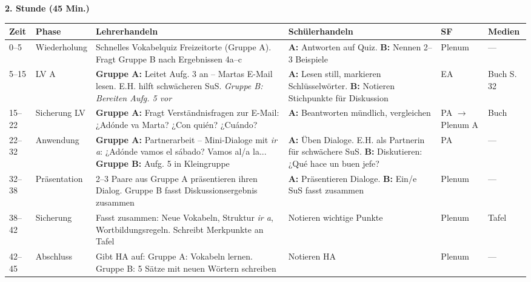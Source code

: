 \documentclass[11pt,a4paper]{article}
\begin{document}
\vspace{1em}

\textbf{2. Stunde (45 Min.)}

\begin{longtable}{|p{1cm}|p{1.5cm}|p{3.8cm}|p{3.2cm}|p{1.5cm}|p{2cm}|}
\hline
\textbf{Zeit} & \textbf{Phase} & \textbf{Lehrerhandeln} & \textbf{Schülerhandeln} & \textbf{SF} & \textbf{Medien} \\
\hline
\endhead

0--5 & Wieder\-holung & Schnelles Vokabelquiz Freizeitorte (Gruppe A). Fragt Gruppe B nach Ergebnissen 4a--c & \textbf{A:} Antworten auf Quiz. \newline \textbf{B:} Nennen 2--3 Beispiele & Plenum & --- \\
\hline

5--15 & LV A & \textbf{Gruppe A:} Leitet Aufg. 3 an -- Martas E-Mail lesen. E.H. hilft schwächeren SuS. \newline \textit{Gruppe B: Bereiten Aufg. 5 vor} & \textbf{A:} Lesen still, markieren Schlüsselwörter. \newline \textbf{B:} Notieren Stichpunkte für Diskussion & EA & Buch S. 32 \\
\hline

15--22 & Sicherung LV & \textbf{Gruppe A:} Fragt Verständnisfragen zur E-Mail: ¿Adónde va Marta? ¿Con quién? ¿Cuándo? & \textbf{A:} Beantworten mündlich, vergleichen & PA $\rightarrow$ Plenum A & Buch \\
\hline

22--32 & Anwen\-dung & \textbf{Gruppe A:} Partnerarbeit -- Mini-Dialoge mit \textit{ir a}: ¿Adónde vamos el sábado? Vamos al/a la... \newline \textbf{Gruppe B:} Aufg. 5 in Kleingruppe & \textbf{A:} Üben Dialoge. E.H. als Partnerin für schwächere SuS. \newline \textbf{B:} Diskutieren: ¿Qué hace un buen jefe? & PA & --- \\
\hline

32--38 & Präsen\-tation & 2--3 Paare aus Gruppe A präsentieren ihren Dialog. Gruppe B fasst Diskussionsergebnis zusammen & \textbf{A:} Präsentieren Dialoge. \newline \textbf{B:} Ein/e SuS fasst zusammen & Plenum & --- \\
\hline

38--42 & Sicherung & Fasst zusammen: Neue Vokabeln, Struktur \textit{ir a}, Wortbildungsregeln. Schreibt Merkpunkte an Tafel & Notieren wichtige Punkte & Plenum & Tafel \\
\hline

42--45 & Abschluss & Gibt HA auf: Gruppe A: Vokabeln lernen. Gruppe B: 5 Sätze mit neuen Wörtern schreiben & Notieren HA & Plenum & --- \\
\hline
\end{longtable}
\end{document}
